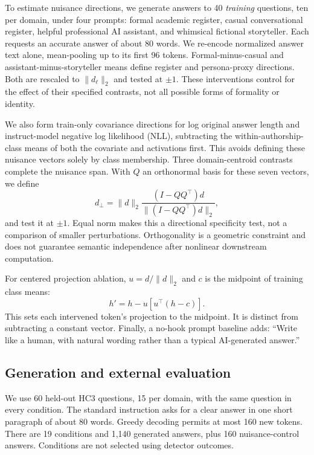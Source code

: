 \documentclass[10pt,twocolumn]{article}
\begin{document}
To estimate nuisance directions, we generate answers to 40 \emph{training} questions, ten per domain, under four prompts: formal academic register, casual conversational register, helpful professional AI assistant, and whimsical fictional storyteller. Each requests an accurate answer of about 80 words. We re-encode normalized answer text alone, mean-pooling up to its first 96 tokens. Formal-minus-casual and assistant-minus-storyteller means define register and persona-proxy directions. Both are rescaled to $\|d_\ell\|_2$ and tested at $\pm1$. These interventions control for the effect of their specified contrasts, not all possible forms of formality or identity.

We also form train-only covariance directions for log original answer length and instruct-model negative log likelihood (NLL), subtracting the within-authorship-class means of both the covariate and activations first. This avoids defining these nuisance vectors solely by class membership. Three domain-centroid contrasts complete the nuisance span. With $Q$ an orthonormal basis for these seven vectors, we define
\begin{equation}
 d_{\perp}=\|d\|_2\frac{(I-QQ^\top)d}{\|(I-QQ^\top)d\|_2},
\end{equation}
and test it at $\pm1$. Equal norm makes this a directional specificity test, not a comparison of smaller perturbations. Orthogonality is a geometric constraint and does not guarantee semantic independence after nonlinear downstream computation.

For centered projection ablation, $u=d/\|d\|_2$ and $c$ is the midpoint of training class means:
\begin{equation}
 h'=h-u[u^\top(h-c)].
\end{equation}
This sets each intervened token's projection to the midpoint. It is distinct from subtracting a constant vector. Finally, a no-hook prompt baseline adds: ``Write like a human, with natural wording rather than a typical AI-generated answer.''

\subsection{Generation and external evaluation}
We use 60 held-out HC3 questions, 15 per domain, with the same question in every condition. The standard instruction asks for a clear answer in one short paragraph of about 80 words. Greedy decoding permits at most 160 new tokens. There are 19 conditions and 1,140 generated answers, plus 160 nuisance-control answers. Conditions are not selected using detector outcomes.
\end{document}
